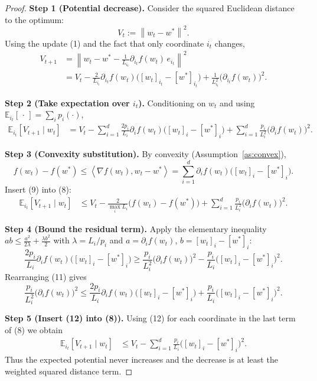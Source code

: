 \documentclass{article}
\newcommand{\E}{\mathbb{E}}
\newcommand{\norm}[1]{\left\|#1\right\|}
\newcommand{\ip}[2]{\left\langle #1,#2\right\rangle}
\newcommand{\grad}{\nabla}
\begin{document}
\begin{proof}
\textbf{Step 1 (Potential decrease).}  
Consider the squared Euclidean distance to the optimum:
\[
V_t:=\norm{w_t-w^{*}}^{2}.
\]
Using the update (1) and the fact that only coordinate $i_t$ changes,
\[
\begin{aligned}
V_{t+1}
&=\norm{w_t-w^{*}-\tfrac{1}{L_{i_t}}\partial_{i_t} f(w_t)\,e_{i_t}}^{2}\\
&=V_t- \frac{2}{L_{i_t}}\partial_{i_t} f(w_t)\big([w_t]_{i_t}-[w^{*}]_{i_t}\big)
   +\frac{1}{L_{i_t}^{2}}\big(\partial_{i_t} f(w_t)\big)^{2}.
\end{aligned}
\tag{7}
\]

\textbf{Step 2 (Take expectation over $i_t$).}  
Conditioning on $w_t$ and using $\E_{i_t}[\,\cdot\,]=\sum_i p_i(\cdot)$,
\[
\begin{aligned}
\E_{i_t}[V_{t+1}\mid w_t]
&=V_t-\sum_{i=1}^{d}\frac{2p_i}{L_i}\partial_i f(w_t)
   \big([w_t]_i-[w^{*}]_i\big)
   +\sum_{i=1}^{d}\frac{p_i}{L_i^{2}}\big(\partial_i f(w_t)\big)^{2}.
\end{aligned}
\tag{8}
\]

\textbf{Step 3 (Convexity substitution).}  
By convexity (Assumption~\ref{as:convex}),
\[
f(w_t)-f(w^{*})\le \ip{\grad f(w_t)}{w_t-w^{*}}
   =\sum_{i=1}^{d}\partial_i f(w_t)\big([w_t]_i-[w^{*}]_i\big).
\tag{9}
\]
Insert (9) into (8):
\[
\begin{aligned}
\E_{i_t}[V_{t+1}\mid w_t]
&\le V_t- \frac{2}{\max_i L_i}\big(f(w_t)-f(w^{*})\big)
   +\sum_{i=1}^{d}\frac{p_i}{L_i^{2}}\big(\partial_i f(w_t)\big)^{2}.
\end{aligned}
\tag{10}
\]

\textbf{Step 4 (Bound the residual term).}  
Apply the elementary inequality $ab\le \frac{a^{2}}{2\lambda}+ \frac{\lambda b^{2}}{2}$ with
$\lambda=L_i/p_i$ and $a=\partial_i f(w_t)$, $b=[w_t]_i-[w^{*}]_i$:
\[
\frac{2p_i}{L_i}\partial_i f(w_t)\big([w_t]_i-[w^{*}]_i\big)
\ge
\frac{p_i}{L_i^{2}}\big(\partial_i f(w_t)\big)^{2}
-\frac{p_i}{L_i}\big([w_t]_i-[w^{*}]_i\big)^{2}.
\tag{11}
\]
Rearranging (11) gives
\[
\frac{p_i}{L_i^{2}}\big(\partial_i f(w_t)\big)^{2}
\le
\frac{2p_i}{L_i}\partial_i f(w_t)\big([w_t]_i-[w^{*}]_i\big)
   +\frac{p_i}{L_i}\big([w_t]_i-[w^{*}]_i\big)^{2}.
\tag{12}
\]

\textbf{Step 5 (Insert (12) into (8)).}  
Using (12) for each coordinate in the last term of (8) we obtain
\[
\begin{aligned}
\E_{i_t}[V_{t+1}\mid w_t]
&\le V_t- \sum_{i=1}^{d}\frac{p_i}{L_i}
   \big([w_t]_i-[w^{*}]_i\big)^{2}.
\end{aligned}
\tag{13}
\]
Thus the expected potential never increases and the decrease is at least the weighted squared distance term.


\end{proof}
\end{document}
